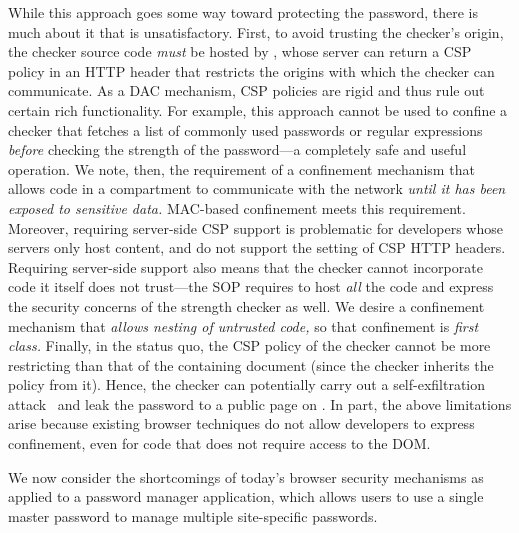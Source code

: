 While this approach goes some way toward protecting the password, there
is much about it that is unsatisfactory.
%
First, to avoid trusting the checker's origin, the checker source code
{\em must} be hosted by , whose server can return a
CSP policy in an HTTP header that restricts the origins with which the
checker can communicate. As a DAC mechanism, CSP policies are rigid
and thus rule out certain rich functionality. For example, this
approach cannot be used to confine a checker that fetches a list of
commonly used passwords or regular expressions {\em before} checking
the strength of the password---a completely safe and useful operation.
We note, then, the requirement of a confinement mechanism that allows
code in a compartment to communicate with the network {\em until it
has been exposed to sensitive data.} MAC-based confinement meets this
requirement.
%
Moreover, requiring server-side CSP support is problematic for
developers whose servers only host content, and do not support the
setting of CSP HTTP headers.
%
Requiring server-side support also means that the checker cannot
incorporate code it itself does not trust---the SOP requires
 to host {\em all} the code and express the
security concerns of the strength checker as well. We desire a
confinement mechanism that {\em allows nesting of untrusted code,}
so that confinement is {\em first class.}
%
Finally, in the status quo, the CSP policy of the checker cannot be
more restricting than that of the containing document (since the
checker inherits the policy from it). Hence, the checker can
potentially carry out a self-exfiltration attack~\cite{selfex} and
leak the password to a public page on .
%
%
In part, the above limitations arise because existing browser
techniques do not allow developers to express confinement, even for
code that does not require access to the DOM.

%
We now consider the shortcomings of today's browser security
mechanisms as applied to a password manager application, which allows
users to use a single master password to manage multiple site-specific
passwords.

